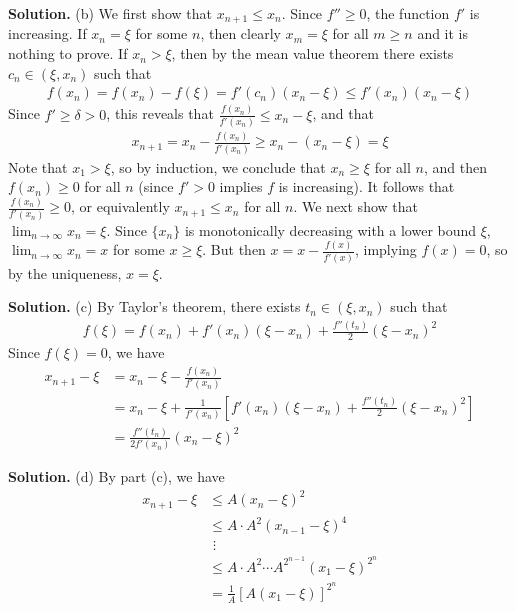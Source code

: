 \documentclass[12pt]{article}
\theoremstyle{definition}
\begin{document}
\smallskip
\noindent\textbf{Solution.}\quad
(b) We first show that $x_{n+1}\le x_n$. Since $f''\ge 0$, the function $f'$ is increasing. If $x_n=\xi$ for some $n$, then clearly $x_m=\xi$ for all $m\ge n$ and it is nothing to prove. If $x_n>\xi$, then by the mean value theorem there exists $c_n\in(\xi,x_n)$ such that
\begin{align*}
f(x_n)=f(x_n)-f(\xi)=f'(c_n)\left(x_n-\xi\right)\le f'(x_n)\left(x_n-\xi\right)
\end{align*}
Since $f'\ge\delta>0$, this reveals that $\frac{f(x_n)}{f'(x_n)}\le x_n-\xi$, and that
\begin{align*}
x_{n+1}=x_n-\frac{f(x_n)}{f'(x_n)}\ge x_n-\left(x_n-\xi\right)=\xi
\end{align*}
Note that $x_1>\xi$, so by induction, we conclude that $x_n\ge\xi$ for all $n$, and then $f(x_n)\ge 0$ for all $n$ (since $f'>0$ implies $f$ is increasing). It follows that $\frac{f(x_n)}{f'(x_n)}\ge 0$, or equivalently $x_{n+1}\le x_n$ for all $n$.
We next show that $\lim_{n\to\infty}x_n=\xi$. Since $\{x_n\}$ is monotonically decreasing with a lower bound $\xi$, $\lim_{n\to\infty}x_n=x$ for some $x\ge\xi$. But then $x=x-\frac{f(x)}{f'(x)}$, implying $f(x)=0$, so by the uniqueness, $x=\xi$.

\smallskip
\noindent\textbf{Solution.}\quad
(c) By Taylor's theorem, there exists $t_n\in(\xi,x_n)$ such that
\begin{align*}
f(\xi)=f(x_n)+f'(x_n)\left(\xi-x_n\right)+\frac{f''(t_n)}{2}\left(\xi-x_n\right)^2
\end{align*}
Since $f(\xi)=0$, we have
\begin{align*}
x_{n+1}-\xi
&=x_n-\xi-\frac{f(x_n)}{f'(x_n)} \\
&=x_n-\xi+\frac{1}{f'(x_n)}\left[f'(x_n)\left(\xi-x_n\right)+\frac{f''(t_n)}{2}\left(\xi-x_n\right)^2\right] \\
&=\frac{f''(t_n)}{2f'(x_n)}\left(x_n-\xi\right)^2
\end{align*}

\smallskip
\noindent\textbf{Solution.}\quad
(d) By part (c), we have
\begin{align*}
x_{n+1}-\xi
&\le A\left(x_n-\xi\right)^2 \\
&\le A\cdot A^2\left(x_{n-1}-\xi\right)^4 \\
&\,\,\vdots \\
&\le A\cdot A^2\cdots A^{2^{n-1}}\left(x_1-\xi\right)^{2^n} \\
&=\frac{1}{A}\left[A\left(x_1-\xi\right)\right]^{2^n}
\end{align*}
\end{document}
